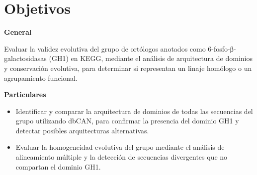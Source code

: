 \section{Objetivos}

\hspace{1cm}\textbf{General}

Evaluar la validez evolutiva del grupo de ortólogos anotados como 6-fosfo-β-galactosidasas (GH1) en KEGG, mediante el análisis de arquitectura de dominios y conservación evolutiva, para determinar si representan un linaje homólogo o un agrupamiento funcional.

\hspace{1cm}\textbf{Particulares}
\begin{itemize}
	\item Identificar y comparar la arquitectura de dominios de todas las secuencias del grupo utilizando dbCAN, para confirmar la presencia del dominio GH1 y detectar posibles arquitecturas alternativas.
	\item Evaluar la homogeneidad evolutiva del grupo mediante el análisis de alineamiento múltiple y la detección de secuencias divergentes que no compartan el dominio GH1.
	
\end{itemize}
   
